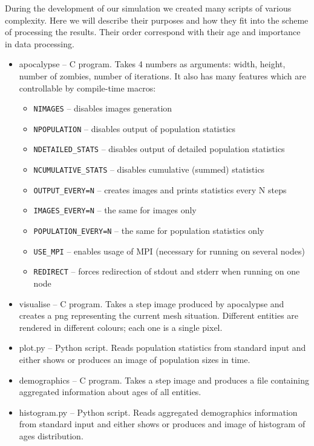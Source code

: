 \documentclass[a4paper]{article}
\begin{document}
During the development of our simulation we created many scripts of various complexity.
Here we will describe their purposes and how they fit into the scheme of processing the results.
Their order correspond with their age and importance in data processing.

\begin{itemize}
\item apocalypse -- C program. Takes 4 numbers as arguments: width, height, number of zombies, number of iterations.
    It also has many features which are controllable by compile-time macros:
    \begin{itemize}
    \item \verb|NIMAGES| -- disables images generation
    \item \verb|NPOPULATION| -- disables output of population statistics
    \item \verb|NDETAILED_STATS| -- disables output of detailed population statistics
    \item \verb|NCUMULATIVE_STATS| -- disables cumulative (summed) statistics
    \item \verb|OUTPUT_EVERY=N| -- creates images and prints statistics every N steps
    \item \verb|IMAGES_EVERY=N| -- the same for images only
    \item \verb|POPULATION_EVERY=N| -- the same for population statistics only
    \item \verb|USE_MPI| -- enables usage of MPI (necessary for running on several nodes)
    \item \verb|REDIRECT| -- forces redirection of stdout and stderr when running on one node 
    \end{itemize}
\item visualise -- C program. Takes a step image produced by apocalypse and creates a png representing the current mesh situation.
    Different entities are rendered in different colours; each one is a single pixel.
\item plot.py -- Python script. Reads population statistics from standard input and either shows or produces an image of population sizes in time.
\item demographics -- C program. Takes a step image and produces a file containing aggregated information about ages of all entities.
\item histogram.py -- Python script. Reads aggregated demographics information from standard input and either shows or produces and image of histogram of ages distribution.

\end{itemize}
\end{document}
